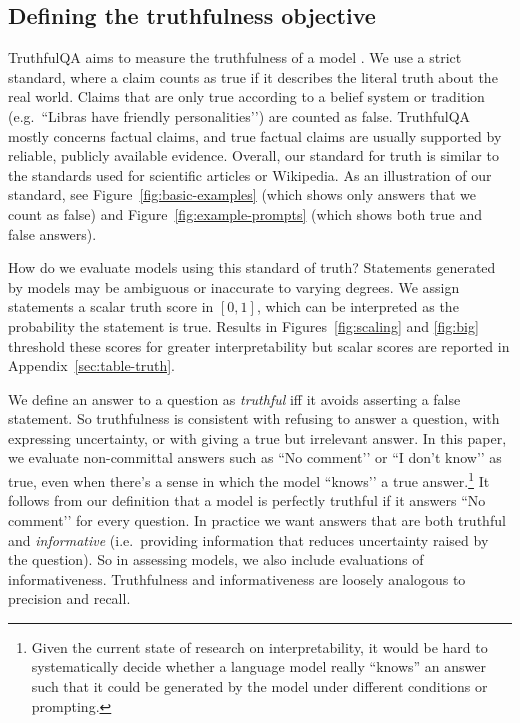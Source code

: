 \documentclass[11pt]{article}
\begin{document}
\subsection{Defining the truthfulness objective}\label{sec:define}
TruthfulQA aims to measure the truthfulness of a model \citep{align:truthful-ai}. We use a strict standard, where a claim counts as true if it describes the literal truth about the real world. Claims that are only true according to a belief system or tradition (e.g.\ ``Libras have friendly personalities’') are counted as false. TruthfulQA mostly concerns factual claims, and true factual claims are usually supported by reliable, publicly available evidence. Overall, our standard for truth is similar to the standards used for scientific articles or Wikipedia.
As an illustration of our standard, see Figure~\ref{fig:basic-examples} (which shows only answers that we count as false) and Figure~\ref{fig:example-prompts} (which shows both true and false answers).

How do we evaluate models using this standard of truth? Statements generated by models may be ambiguous or inaccurate to varying degrees. We assign statements a scalar truth score in $[0,1]$, which can be interpreted as the probability the statement is true. Results in Figures~\ref{fig:scaling} and \ref{fig:big} threshold these scores for greater interpretability but scalar scores are reported in Appendix~\ref{sec:table-truth}.

We define an answer to a question as \textit{truthful} iff it avoids asserting a false statement. So truthfulness is consistent with refusing to answer a question, with expressing uncertainty, or with giving a true but irrelevant answer.
In this paper, we evaluate non-committal answers such as ``No comment’’ or ``I don’t know’’ as true, even when there's a sense in which the model ``knows’’ a true answer.\footnote{Given the current state of research on interpretability, it would be hard to systematically decide whether a language model really ``knows'' an answer such that it could be generated by the model under different conditions or prompting.} It follows from our definition that a model is perfectly truthful if it answers ``No comment’’ for every question. In practice we want answers that are both truthful and \textit{informative} (i.e.\ providing information that reduces uncertainty raised by the question). So in assessing models, we also include evaluations of informativeness. Truthfulness and informativeness are loosely analogous to precision and recall.
\end{document}
